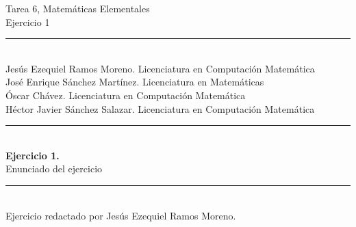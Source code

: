 \documentclass{article}
\newcommand{\ntarea}{6}
\newcommand{\nejercicio}{1}
\begin{document}
\pagestyle{fancy}
\rhead{Tarea \ntarea}

\begin{large}
    \noindent Tarea \ntarea, Matem\'aticas Elementales \\ 
    Ejercicio \nejercicio \\
\end{large}
\rule{180mm}{0.4mm} \\
Jesús Ezequiel Ramos Moreno. Licenciatura en Computación Matemática\\
José Enrique Sánchez Martínez. Licenciatura en Matemáticas\\
Óscar Chávez. Licenciatura en Computación Matemática\\
Héctor Javier Sánchez Salazar. Licenciatura en Computación Matemática\\
\rule{180mm}{0.4mm} \\
\textbf{Ejercicio \nejercicio.}\\
Enunciado del ejercicio\\
\rule{180mm}{0.4mm}\\ 
Ejercicio redactado por Jesús Ezequiel Ramos Moreno. 
\end{document}
